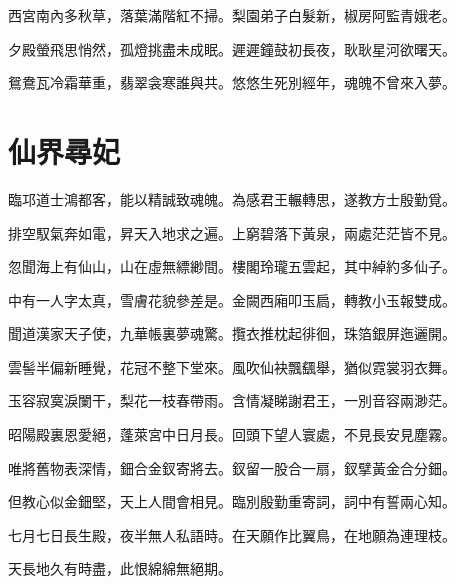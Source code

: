 \documentclass[UTF8]{ctexart}
\begin{document}
西宮南內多秋草，落葉滿階紅不掃。梨園弟子白髮新，椒房阿監青娥老。

夕殿螢飛思悄然，孤燈挑盡未成眠。遲遲鐘鼓初長夜，耿耿星河欲曙天。

鴛鴦瓦冷霜華重，翡翠衾寒誰與共。悠悠生死別經年，魂魄不曾來入夢。

\section{仙界尋妃}

臨邛道士鴻都客，能以精誠致魂魄。為感君王輾轉思，遂教方士殷勤覓。

排空馭氣奔如電，昇天入地求之遍。上窮碧落下黃泉，兩處茫茫皆不見。

忽聞海上有仙山，山在虛無縹緲間。樓閣玲瓏五雲起，其中綽約多仙子。

中有一人字太真，雪膚花貌參差是。金闕西廂叩玉扃，轉教小玉報雙成。

聞道漢家天子使，九華帳裏夢魂驚。攬衣推枕起徘徊，珠箔銀屏迤邐開。

雲髻半偏新睡覺，花冠不整下堂來。風吹仙袂飄颻舉，猶似霓裳羽衣舞。

玉容寂寞淚闌干，梨花一枝春帶雨。含情凝睇謝君王，一別音容兩渺茫。

昭陽殿裏恩愛絕，蓬萊宮中日月長。回頭下望人寰處，不見長安見塵霧。

唯將舊物表深情，鈿合金釵寄將去。釵留一股合一扇，釵擘黃金合分鈿。

但教心似金鈿堅，天上人間會相見。臨別殷勤重寄詞，詞中有誓兩心知。

七月七日長生殿，夜半無人私語時。在天願作比翼鳥，在地願為連理枝。

天長地久有時盡，此恨綿綿無絕期。
\end{document}
